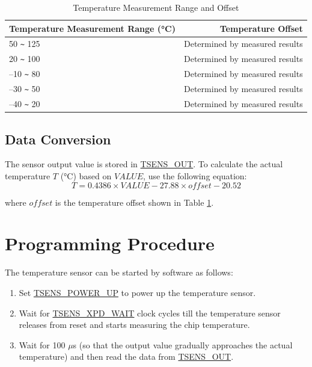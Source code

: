 \documentclass[main\_\_EN.tex]{subfiles}
\begin{document}
\begin{longtable}[c]{|l|r|}
    \caption{Temperature Measurement Range and Offset}
    \label{tab:tsensor-dac}
    \\\hline
    \rowcolor{lightgray}
    Temperature Measurement Range (°C)   & Temperature Offset \\\hline
    50 \verb+~+ 125 & Determined by measured results \\\hline
    20 \verb+~+ 100 &  Determined by measured results \\\hline
    –10 \verb+~+ 80 &  Determined by measured results \\\hline
    –30 \verb+~+ 50 &  Determined by measured results \\\hline
    –40 \verb+~+ 20 &  Determined by measured results \\\hline
\end{longtable}

\subsection{Data Conversion}

The sensor output value is stored in \hyperref[fielddesc:TSENSOUT]{TSENS\_OUT}. To calculate the actual temperature \(T\) (°C) based on \(VALUE\), use the following equation:
\[
        T = 0.4386 \times VALUE - 27.88 \times offset - 20.52
\]

where \(offset\) is the temperature offset shown in Table \ref{tab:tsensor-dac}.


\section{Programming Procedure}

The temperature sensor can be started by software as follows:

\begin{enumerate}
    \item Set \hyperref[fielddesc:TSENSPOWERUP]{TSENS\_POWER\_UP} to power up the temperature sensor.
    \item Wait for \hyperref[fielddesc:TSENSXPDWAIT]{TSENS\_XPD\_WAIT} clock cycles till the temperature sensor releases from reset and starts measuring the chip temperature.
    \item Wait for 100 $\mu$s (so that the output value gradually approaches the actual temperature) and then read the data from \hyperref[fielddesc:TSENSOUT]{TSENS\_OUT}.
\end{enumerate}
\end{document}
